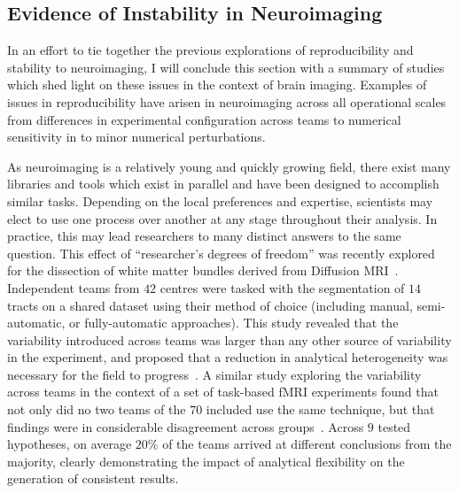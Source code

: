 \subsection{Evidence of Instability in Neuroimaging}
In an effort to tie together the previous explorations of reproducibility and stability to neuroimaging, I will
conclude this section with a summary of studies which shed light on these issues in the context of brain imaging.
Examples of issues in reproducibility have arisen in neuroimaging across all operational scales from differences in
experimental configuration across teams to numerical sensitivity in to minor numerical perturbations.

As neuroimaging is a relatively young and quickly growing field, there exist many libraries and tools which exist in
parallel and have been designed to accomplish similar tasks. Depending on the local preferences and expertise, scientists
may elect to use one process over another at any stage throughout their analysis. In practice, this may lead researchers
to many distinct answers to the same question. This effect of ``researcher's degrees of freedom'' was recently explored
for the dissection of white matter bundles derived from Diffusion MRI~\cite{schilling2020tractography}. Independent teams
from $42$ centres were tasked with the segmentation of $14$ tracts on a shared dataset using their method of choice
(including manual, semi-automatic, or fully-automatic approaches). This study revealed that the variability introduced
across teams was larger than any other source of variability in the experiment, and proposed that a reduction in
analytical heterogeneity was necessary for the field to progress~\cite{schilling2020tractography}. A similar study
exploring the variability across teams in the context of a set of task-based fMRI
experiments found that not only did no two teams of the $70$ included use the same technique, but that findings were in
considerable disagreement across groups~\cite{botvinik2020variability}. Across $9$ tested hypotheses, on average $20\%$
of the teams arrived at different conclusions from the majority, clearly demonstrating the impact of analytical
flexibility on the generation of consistent results.

